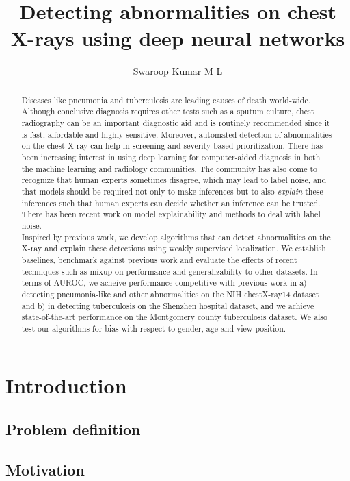 \documentclass[11pt,twoside,a4paper]{report}
\title{Detecting abnormalities on chest X-rays using deep neural networks}
\author{Swaroop Kumar M L}
\begin{document}
\maketitle
\begin{abstract}
    Diseases like pneumonia and tuberculosis are leading causes of death world-wide.
    Although conclusive diagnosis requires other tests such as a sputum culture,
    chest radiography can be an important diagnostic aid and is routinely recommended
    since it is fast, affordable and highly sensitive. Moreover, automated detection of
    abnormalities on the chest X-ray can help in screening and severity-based prioritization.
    There has been increasing interest in using deep learning for computer-aided diagnosis in both the
    machine learning and radiology communities. 
    The community has also come to recognize that human experts
    sometimes disagree, which may lead to label noise, and that models should be required not only
    to make inferences but to also \emph{explain} these inferences such that human experts can
    decide whether an inference can be trusted. There has been recent work on model explainability
    and methods to deal with label noise.\\

    Inspired by previous work, we develop algorithms that can detect abnormalities on the X-ray
    and explain these detections using weakly supervised localization.
    We establish baselines, benchmark against previous work and evaluate the effects of recent techniques
    such as mixup on performance and generalizability to other datasets.
    In terms of AUROC, we acheive performance competitive with previous work in a) detecting pneumonia-like
    and other abnormalities on the NIH chestX-ray14 dataset and b) in detecting tuberculosis on the Shenzhen
    hospital dataset, and we achieve state-of-the-art performance on the Montgomery county tuberculosis dataset.
    We also test our algorithms for bias with respect to gender, age and view position.
\end{abstract}
\tableofcontents
\chapter{Introduction}
    \section{Problem definition}
    \section{Motivation}
\end{document}
